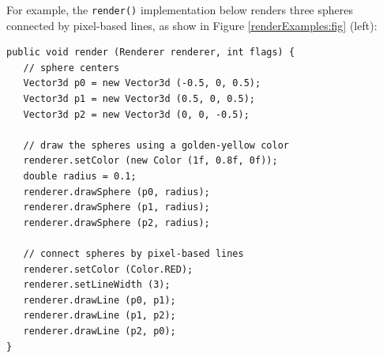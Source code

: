For example, the {\tt render()} implementation below renders three
spheres connected by pixel-based lines, as show in
Figure \ref{renderExamples:fig} (left):
%
\begin{lstlisting}[]
public void render (Renderer renderer, int flags) {
   // sphere centers
   Vector3d p0 = new Vector3d (-0.5, 0, 0.5);
   Vector3d p1 = new Vector3d (0.5, 0, 0.5);
   Vector3d p2 = new Vector3d (0, 0, -0.5);

   // draw the spheres using a golden-yellow color
   renderer.setColor (new Color (1f, 0.8f, 0f));
   double radius = 0.1;
   renderer.drawSphere (p0, radius);
   renderer.drawSphere (p1, radius);
   renderer.drawSphere (p2, radius);

   // connect spheres by pixel-based lines
   renderer.setColor (Color.RED);
   renderer.setLineWidth (3);
   renderer.drawLine (p0, p1);
   renderer.drawLine (p1, p2);
   renderer.drawLine (p2, p0);
}
\end{lstlisting}
%

